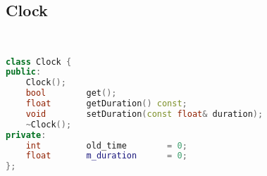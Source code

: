 \subsection{Clock}
\begin{lstlisting}[language=C++]


class Clock {
public:
    Clock();
    bool        get();
    float       getDuration() const;
    void        setDuration(const float& duration);
    ~Clock();
private:
    int         old_time        = 0;
    float       m_duration      = 0;
};






\end{lstlisting}
